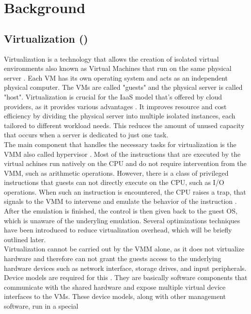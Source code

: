 \chapter{Background}\label{chapter:background}
\section{Virtualization (\checkmark)}
Virtualization is a technology that allows the creation of isolated virtual environments also known as 
Virtual Machines that run on the same physical server \cite{virtualization_review}. Each VM has its own 
operating system and acts as an independent physical computer. The VMs are called "guests" and the 
physical server is called "host". Virtualization is crucial for the \ac{IaaS} model that's offered by 
cloud providers, as it provides various advantages \cite{virtualization_review}. It improves resource and 
cost efficiency by dividing the physical server into multiple isolated instances, each tailored to 
different workload needs. This reduces the amount of unused capacity that occurs when a server is dedicated 
to just one task. \\
The main component that handles the necessary tasks for virtualization is the \ac{VMM} 
also called hypervisor \cite{nitro_whitepaper}. Most of the instructions that are executed by the virtual 
achines run natively on the CPU and do not require intervention from the \acs{VMM}, such as arithmetic 
operations. 
However, there is a class of privileged instructions that guests can not directly execute on the CPU, 
such as I/O operations. When such an instruction is encountered, the CPU raises a 
trap, that signals to the \acs{VMM} to intervene and emulate the behavior of the instruction \cite{nitro_whitepaper}.  
After the emulation is finished, the control is then given back to the guest OS, 
which is unaware of the underyling emulation. Several optimizations techniques have been introduced 
to reduce virtualization overhead, which will be briefly outlined later. \\
Virtualization cannot be carried out by the VMM alone, as it does not virtualize hardware and therefore 
can not grant the guests access to the underlying hardware devices such as network interface, storage drives, 
and input peripherals. Device models are required for this \cite{nitro_whitepaper}. They are basically 
software components that communicate with the shared hardware and expose multiple virtual device 
interfaces to the VMs. These device models, along with other management software, run in a special 
